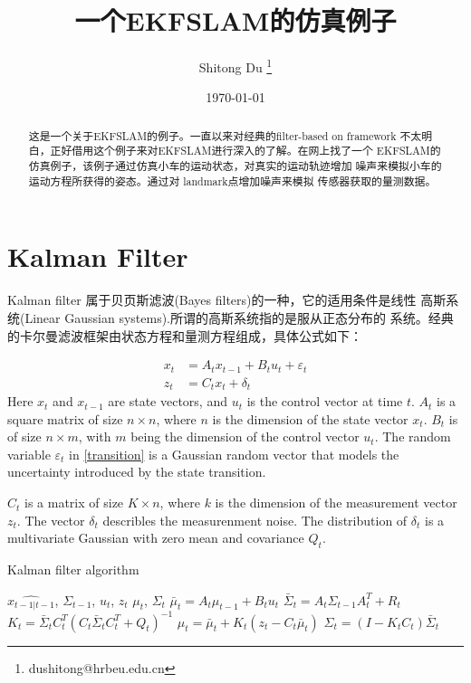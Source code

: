 \documentclass[UTF8,a4paper,10pt]{ctexart}
\title{一个EKFSLAM的仿真例子}
\author{ Shitong Du 
  \thanks{dushitong@hrbeu.edu.cn} 
}
\date{\today}
\begin{document}
    \maketitle
\begin{abstract}
这是一个关于EKFSLAM的例子。一直以来对经典的filter-based on framework 
不太明白，正好借用这个例子来对EKFSLAM进行深入的了解。在网上找了一个
EKFSLAM的仿真例子，该例子通过仿真小车的运动状态，对真实的运动轨迹增加
噪声来模拟小车的运动方程所获得的姿态。通过对 landmark点增加噪声来模拟
传感器获取的量测数据。
\end{abstract}
\section{Kalman Filter} 
\label{sec:one}
Kalman filter 属于贝页斯滤波(Bayes filters)的一种，它的适用条件是线性
高斯系统(Linear Gaussian systems).所谓的高斯系统指的是服从正态分布的
系统。经典的卡尔曼滤波框架由状态方程和量测方程组成，具体公式如下：

\begin{align}
x_t &= A_tx_{t-1}+B_tu_t+\varepsilon_t\\
z_t &= C_tx_t+\delta_t
\label{transition}
\end{align}
Here $x_t$ and $x_{t-1}$ are state vectors, and $u_t$ is the control vector 
at time $t$. $A_t$ is a square matrix of size $n \times n$, where $n$ is the 
dimension of the state vector $x_t$. $B_t$ is of size $n \times m$, with $m$ 
being the dimension of the control vector $u_t$. The random variable $\varepsilon_t$ 
in \eqref{transition} is a Gaussian random vector that models the uncertainty 
introduced by the state transition. 

$C_t$ is a matrix of size $K \times n$, where $k$ is the dimension of the 
measurement vector $z_t$. The vector $\delta_t$ describles the measurenment 
noise. The distribution of $\delta_t$ is a multivariate Gaussian with zero 
mean and covariance $	Q_t$.
\begin{algorithm}
    \caption{ Kalman filter algorithm }
    \label{alg:KF}
   \begin{algorithmic}[1]
       \Require $\hat{x_{t-1|t-1}}$, $\Sigma_{t-1}$, $u_t$, $z_t$
       \Ensure $\mu_t$, $\Sigma_t$
       \State $\bar{\mu}_t=A_t\mu_{t-1}+B_tu_{t}$
       \State $\bar{\Sigma}_{t}=A_t\Sigma_{t-1}A_t^T+R_t$
       \State $K_t=\bar{\Sigma}_tC_t^T(C_t\bar{\Sigma}_tC_t^T+Q_t)^{-1}$
       \State $\mu_t=\bar{\mu}_t+K_t(z_t-C_t\bar{\mu}_t)$
       \State $\Sigma_t=(I-K_tC_t)\bar{\Sigma}_t$
       \State {} 
       \EndFunction
   \end{algorithmic}
\end{algorithm}
\end{document}
